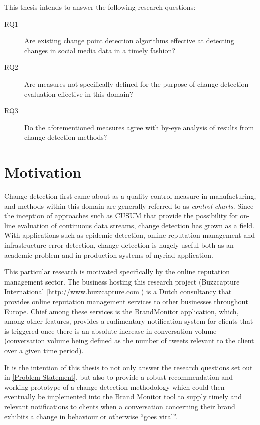\documentclass{uvamscse}	%
\begin{document}
This thesis intends to answer the following research questions:

\begin{description}
	\item[RQ1] Are existing change point detection algorithms effective at detecting changes in social media data in a timely fashion?
	\item[RQ2] Are measures not specifically defined for the purpose of change detection evaluation effective in this domain?
	\item[RQ3] Do the aforementioned measures agree with by-eye analysis of results from change detection methods?
\end{description}


\section{Motivation}

Change detection first came about as a quality control measure in manufacturing, and methods within this domain are generally referred to as \emph{control charts}. Since the inception of approaches such as CUSUM that provide the possibility for on-line evaluation of continuous data streams, change detection has grown as a field. With applications such as epidemic detection, online reputation management and infrastructure error detection, change detection is hugely useful both as an academic problem and in production systems of myriad application.

This particular research is motivated specifically by the online reputation management sector. The business hosting this research project (Buzzcapture International [\url{http://www.buzzcapture.com}]) is a Dutch consultancy that provides online reputation management services to other businesses throughout Europe. Chief among these services is the BrandMonitor application, which, among other features, provides a rudimentary notification system for clients that is triggered once there is an absolute increase in conversation volume (conversation volume being defined as the number of tweets relevant to the client over a given time period).

It is the intention of this thesis to not only answer the research questions set out in \autoref{Problem Statement}, but also to provide a robust recommendation and working prototype of a change detection methodology which could then eventually be implemented into the Brand Monitor tool to supply timely and relevant notifications to clients when a conversation concerning their brand exhibits a change in behaviour or otherwise ``goes viral''.
\end{document}
